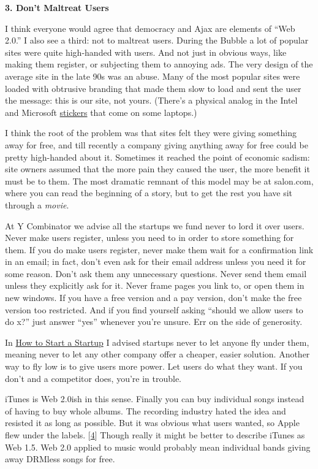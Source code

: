\textbf{3. Don't Maltreat Users}

I think everyone would agree that democracy and Ajax are elements of
``Web 2.0.'' I also see a third: not to maltreat users. During the
Bubble a lot of popular sites were quite high-handed with users. And not
just in obvious ways, like making them register, or subjecting them to
annoying ads. The very design of the average site in the late 90s was an
abuse. Many of the most popular sites were loaded with obtrusive
branding that made them slow to load and sent the user the message: this
is our site, not yours. (There's a physical analog in the Intel and
Microsoft \href{designedforwindows.html}{stickers} that come on some
laptops.)

I think the root of the problem was that sites felt they were giving
something away for free, and till recently a company giving anything
away for free could be pretty high-handed about it. Sometimes it reached
the point of economic sadism: site owners assumed that the more pain
they caused the user, the more benefit it must be to them. The most
dramatic remnant of this model may be at salon.com, where you can read
the beginning of a story, but to get the rest you have sit through a
\emph{movie}.

At Y Combinator we advise all the startups we fund never to lord it over
users. Never make users register, unless you need to in order to store
something for them. If you do make users register, never make them wait
for a confirmation link in an email; in fact, don't even ask for their
email address unless you need it for some reason. Don't ask them any
unnecessary questions. Never send them email unless they explicitly ask
for it. Never frame pages you link to, or open them in new windows. If
you have a free version and a pay version, don't make the free version
too restricted. And if you find yourself asking ``should we allow users
to do x?'' just answer ``yes'' whenever you're unsure. Err on the side
of generosity.

In \href{start.html}{How to Start a Startup} I advised startups never to
let anyone fly under them, meaning never to let any other company offer
a cheaper, easier solution. Another way to fly low is to give users more
power. Let users do what they want. If you don't and a competitor does,
you're in trouble.

iTunes is Web 2.0ish in this sense. Finally you can buy individual songs
instead of having to buy whole albums. The recording industry hated the
idea and resisted it as long as possible. But it was obvious what users
wanted, so Apple flew under the labels. {[}\hyperref[f4n]{4}{]} Though
really it might be better to describe iTunes as Web 1.5. Web 2.0 applied
to music would probably mean individual bands giving away DRMless songs
for free.

